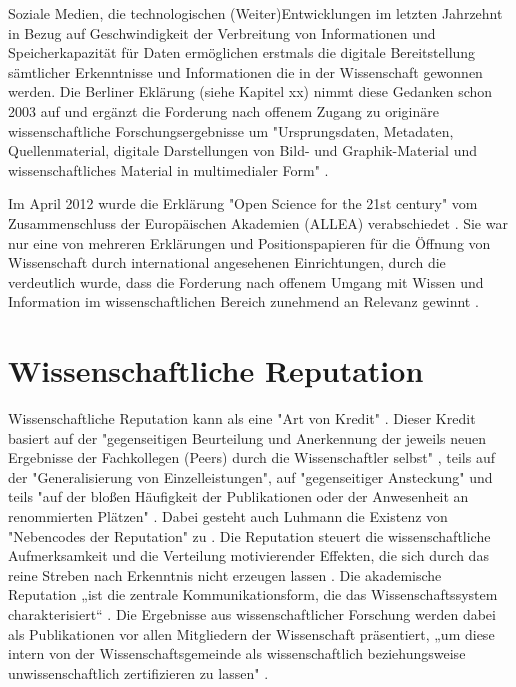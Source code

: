 Soziale Medien, die technologischen (Weiter)Entwicklungen im letzten Jahrzehnt in Bezug auf Geschwindigkeit der Verbreitung von Informationen und Speicherkapazität für Daten ermöglichen erstmals die digitale Bereitstellung sämtlicher Erkenntnisse und Informationen die in der Wissenschaft gewonnen werden. Die Berliner Eklärung (siehe Kapitel xx) nimmt diese Gedanken schon 2003 auf und ergänzt die Forderung nach offenem Zugang zu originäre wissenschaftliche Forschungsergebnisse um "Ursprungsdaten, Metadaten, Quellenmaterial, digitale Darstellungen von Bild- und Graphik-Material und wissenschaftliches Material in multimedialer Form" \cite{berliner_erklaerung_2003}.

Im April 2012 wurde die Erklärung "Open Science for the 21st century" vom Zusammenschluss der Europäischen Akademien (ALLEA) verabschiedet \cite{ALLEA_2012}. Sie war nur eine von mehreren Erklärungen und Positionspapieren für die Öffnung von Wissenschaft durch international angesehenen Einrichtungen, durch die verdeutlich wurde, dass die Forderung nach offenem Umgang mit Wissen und Information im wissenschaftlichen Bereich zunehmend an Relevanz gewinnt \cite{schulze_2013_open}.

\section{Wissenschaftliche Reputation}

Wissenschaftliche Reputation kann als eine "Art von Kredit" \cite{luhmann_1970_selbststeuerung}. Dieser Kredit basiert auf der "gegenseitigen Beurteilung und Anerkennung der jeweils neuen Ergebnisse der Fachkollegen (Peers) durch die Wissenschaftler selbst"\cite{Hanekop_2014} \cite{suchen_Hornbostel_2006}, teils auf der "Generalisierung von Einzelleistungen", auf "gegenseitiger Ansteckung" und teils "auf der bloßen Häufigkeit der Publikationen oder der Anwesenheit an renommierten Plätzen" \cite{luhmann_1970_selbststeuerung}. Dabei gesteht auch Luhmann die Existenz von "Nebencodes der Reputation" zu \cite{schmoch_2003_hochschulforschung}. Die Reputation steuert die wissenschaftliche Aufmerksamkeit und die Verteilung motivierender Effekten, die sich durch das reine Streben nach Erkenntnis nicht erzeugen lassen \cite{suchen_luhmann}. Die akademische Reputation „ist die zentrale Kommunikationsform, die das Wissenschaftssystem charakterisiert“ \cite{Rutenfranz_1997}. Die Ergebnisse aus wissenschaftlicher Forschung werden dabei als Publikationen vor allen Mitgliedern der Wissenschaft präsentiert, „um diese intern von der Wissenschaftsgemeinde als wissenschaftlich beziehungsweise unwissenschaftlich zertifizieren zu lassen" \cite{Rutenfranz_1997}.

